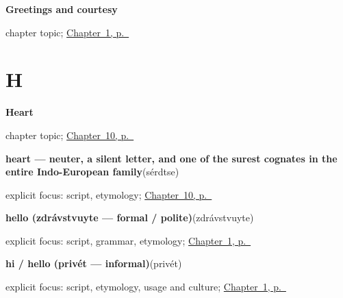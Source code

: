 \noindent\begin{minipage}[t]{\linewidth}
\raggedright
\textbf{Greetings and courtesy}\par
\footnotesize chapter topic; \hyperref[ch:russian-greetings]{Chapter~1, p.~\pageref*{ch:russian-greetings}}
\end{minipage}\par\smallskip

\section*{H}

\noindent\begin{minipage}[t]{\linewidth}
\raggedright
\textbf{Heart}\par
\footnotesize chapter topic; \hyperref[ch:russian-heart]{Chapter~10, p.~\pageref*{ch:russian-heart}}
\end{minipage}\par\smallskip

\noindent\begin{minipage}[t]{\linewidth}
\raggedright
\textbf{heart — neuter, a silent letter, and one of the surest cognates in the entire Indo-European family}\enspace\emph{}\enspace(sérdtse)\par
\footnotesize explicit focus: script, etymology; \hyperref[ch:russian-heart]{Chapter~10, p.~\pageref*{ch:russian-heart}}
\end{minipage}\par\smallskip

\noindent\begin{minipage}[t]{\linewidth}
\raggedright
\textbf{hello (zdrávstvuyte — formal / polite)}\enspace\emph{}\enspace(zdrávstvuyte)\par
\footnotesize explicit focus: script, grammar, etymology; \hyperref[ch:russian-greetings]{Chapter~1, p.~\pageref*{ch:russian-greetings}}
\end{minipage}\par\smallskip

\noindent\begin{minipage}[t]{\linewidth}
\raggedright
\textbf{hi / hello (privét — informal)}\enspace\emph{}\enspace(privét)\par
\footnotesize explicit focus: script, etymology, usage and culture; \hyperref[ch:russian-greetings]{Chapter~1, p.~\pageref*{ch:russian-greetings}}
\end{minipage}\par\smallskip

